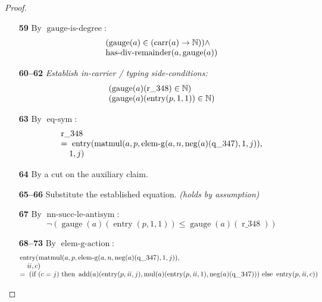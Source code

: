 \documentclass[11pt]{article}
\theoremstyle{plain}
\begin{document}
\begin{proof}
\begin{itemize}[leftmargin=2.8em, itemsep=4pt, parsep=1pt]
  \item[\textbf{59}] By $\operatorname{gauge\text{-}is\text{-}degree}$:
\begin{equation*}
\begin{array}{@{}l@{}} (\operatorname{gauge}(a) \in (\operatorname{carr}(a) \to \mathbb{N})) \wedge \\ \operatorname{has\text{-}div\text{-}remainder}(a, \operatorname{gauge}(a)) \end{array}
\end{equation*}

  \item[\textbf{60--62}] \emph{Establish in-carrier / typing side-conditions:}
\begin{equation*}
\begin{array}{@{}l@{}}
(\operatorname{gauge}(a)(\operatorname{r\_348}) \in \mathbb{N}) \\
(\operatorname{gauge}(a)(\operatorname{entry}(p, 1, 1)) \in \mathbb{N})
\end{array}
\end{equation*}

  \item[\textbf{63}] By $\operatorname{eq\text{-}sym}$:
\begin{equation*}
\begin{array}{@{}l@{}} \operatorname{r\_348} \\ =\; \operatorname{entry}(\operatorname{matmul}(a, p, \operatorname{elem\text{-}g}(a, n, \operatorname{neg}(a)(\operatorname{q\_347}), 1, j)), \\ \quad 1, j) \end{array}
\end{equation*}

  \item[\textbf{64}] By a cut on the auxiliary claim.
  \item[\textbf{65--66}] Substitute the established equation.  \emph{(holds by assumption)}
  \item[\textbf{67}] By $\operatorname{nn\text{-}succ\text{-}le\text{-}antisym}$:
\begin{equation*}
\neg (\operatorname{gauge}(a)(\operatorname{entry}(p, 1, 1)) \leq \operatorname{gauge}(a)(\operatorname{r\_348}))
\end{equation*}

  \item[\textbf{68--73}] By $\operatorname{elem\text{-}g\text{-}action}$:
\begin{equation*}
\begin{array}{@{}l@{}} \operatorname{entry}(\operatorname{matmul}(a, p, \operatorname{elem\text{-}g}(a, n, \operatorname{neg}(a)(\operatorname{q\_347}), 1, j)), \\ \quad \mathit{ii}, c) \\ =\; \left(\text{if }(c = j)\text{ then }\operatorname{add}(a)(\operatorname{entry}(p, \mathit{ii}, j), \operatorname{mul}(a)(\operatorname{entry}(p, \mathit{ii}, 1), \operatorname{neg}(a)(\operatorname{q\_347})))\text{ else }\operatorname{entry}(p, \mathit{ii}, c)\right) \end{array}
\end{equation*}


\end{itemize}
\end{proof}
\end{document}
